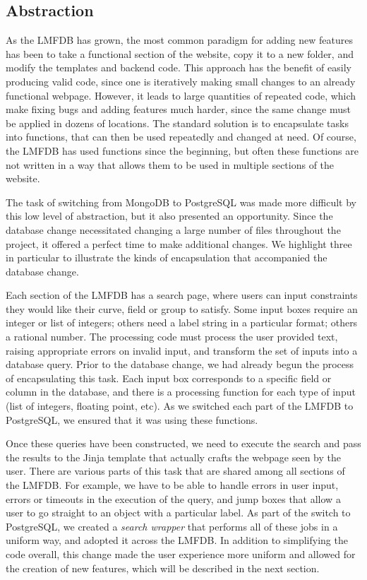 \documentclass{article}
\begin{document}
\subsection{Abstraction}

As the LMFDB has grown, the most common paradigm for adding new features has been to take a functional section of the website, copy it to a new folder, and modify the templates and backend code.
This approach has the benefit of easily producing valid code, since one is iteratively making small changes to an already functional webpage.
However, it leads to large quantities of repeated code, which make fixing bugs and adding features much harder, since the same change must be applied in dozens of locations.
The standard solution is to encapsulate tasks into functions, that can then be used repeatedly and changed at need.
Of course, the LMFDB has used functions since the beginning, but often these functions are not written in a way that allows them to be used in multiple sections of the website.

The task of switching from MongoDB to PostgreSQL was made more difficult by this low level of abstraction, but it also presented an opportunity.
Since the database change necessitated changing a large number of files throughout the project, it offered a perfect time to make additional changes.
We highlight three in particular to illustrate the kinds of encapsulation that accompanied the database change.

Each section of the LMFDB has a search page, where users can input constraints they would like their curve, field or group to satisfy.
Some input boxes require an integer or list of integers; others need a label string in a particular format; others a rational number.
The processing code must process the user provided text, raising appropriate errors on invalid input, and transform the set of inputs into a database query.
Prior to the database change, we had already begun the process of encapsulating this task.
Each input box corresponds to a specific field or column in the database, and there is a processing function for each type of input (list of integers, floating point, etc).
As we switched each part of the LMFDB to PostgreSQL, we ensured that it was using these functions.

Once these queries have been constructed, we need to execute the search and pass the results to the Jinja template that actually crafts the webpage seen by the user.
There are various parts of this task that are shared among all sections of the LMFDB.
For example, we have to be able to handle errors in user input, errors or timeouts in the execution of the query, and jump boxes that allow a user to go straight to an object with a particular label.
As part of the switch to PostgreSQL, we created a \emph{search wrapper} that performs all of these jobs in a uniform way, and adopted it across the LMFDB.
In addition to simplifying the code overall, this change made the user experience more uniform and allowed for the creation of new features, which will be described in the next section.
\end{document}
